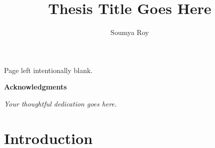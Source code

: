 \documentclass[plain]{hvdthesis}
\author{Soumya Roy}
\title{Thesis Title Goes Here}
\begin{document}


\clearpage
\thispagestyle{empty}
\begin{center}
\vspace*{\fill}
Page left intentionally blank.
\vspace*{\fill}
\end{center}

\frontmatter

\makecover

%
{\singlespace
\tableofcontents
}
\newpage
\clearpage


\newpage
%
\thispagestyle{plain}

\vskip 0.5cm
{\centerline {\Large \bf Acknowledgments}}
\vskip 0.5cm
\normalsize




\clearpage
%
\thispagestyle{plain}

\vspace*{\fill}
{\centerline {\em Your thoughtful dedication goes here.}}
\vspace*{\fill}


\mainmatter
\pagestyle{fancy}


%
%

\chapter[Introduction]{Introduction}\label{c:intro}

\clearpage
%
\end{document}

